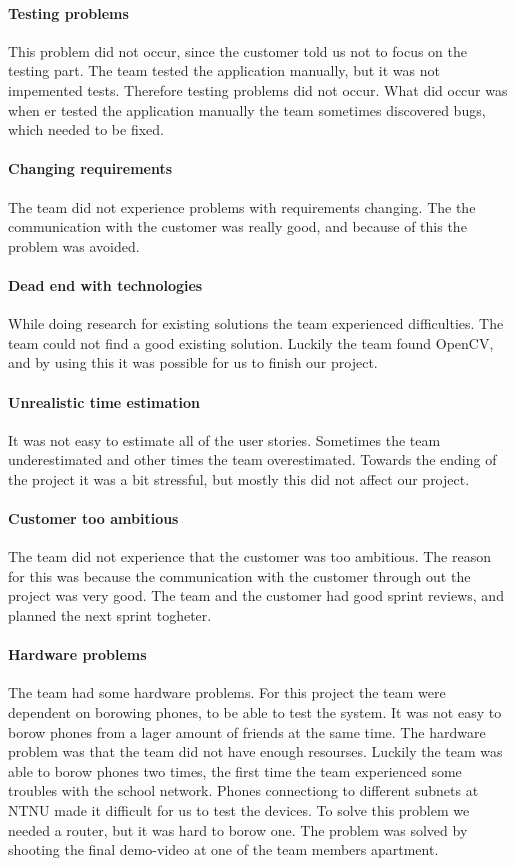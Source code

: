 \paragraph{Testing problems}
This problem did not occur, since the customer told us not to focus on the testing part. The team tested the application manually, but it was not impemented tests. Therefore testing problems did not occur. What did occur was when er tested the application manually the team sometimes discovered bugs, which needed to be fixed. 
\paragraph{Changing requirements} 
The team did not experience problems with requirements changing. The the communication with the customer was really good, and because of this the problem was avoided.


\paragraph{Dead end with technologies}
While doing research for existing solutions the team experienced difficulties. The team could not find a good existing solution. Luckily the team found OpenCV, and by using this it was possible for us to finish our project. 

\paragraph{Unrealistic time estimation}
It was not easy to estimate all of the user stories. Sometimes the team underestimated and other times the team overestimated. Towards the ending of the project it was a bit stressful, but mostly this did not affect our project.

\paragraph{Customer too ambitious}
The team did not experience that the customer was too ambitious. The reason for this was because the communication with the customer through out the project was very good. The team and the customer had good sprint reviews, and planned the next sprint togheter.

\paragraph{Hardware problems}
The team had some hardware problems. For this project the team were dependent on borowing phones, to be able to test the system. It was not easy to borow phones from a lager amount of friends at the same time. The hardware problem was that the team did not have enough resourses. Luckily the team was able to borow phones two times, the first time the team experienced some troubles with the school network. Phones connectiong to different subnets at NTNU made it difficult for us to test the devices. To solve this problem we needed a router, but it was hard to borow one. The problem was solved by shooting the final demo-video at one of the team members apartment.  
